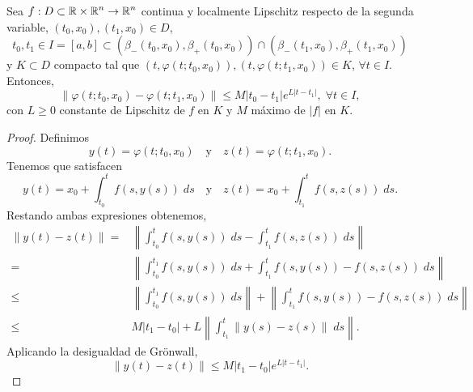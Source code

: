 \begin{prop}
Sea $\displaystyle f : D \subset \mathbb{R} \times \mathbb{R}^{n} \to \mathbb{R}^{n} $ continua y localmente Lipschitz respecto de la segunda variable, $\displaystyle \left(t_{0}, x_{0}\right), \left(t_{1}, x_{0}\right)\in D $, 
\[t_{0}, t_{1} \in I = \left[a,b\right] \subset \left(\beta_{-}\left(t_{0}, x_{0}\right), \beta_{+ }\left(t_{0}, x_{0}\right)\right) \cap \left(\beta_{- }\left(t_{1}, x_{0}\right), \beta_{+ }\left(t_{1},x_{0}\right)\right) \]
y $\displaystyle K \subset D $ compacto tal que $\displaystyle \left(t, \varphi\left(t; t_{0}, x_{0}\right)\right), \left(t, \varphi\left(t; t_{1}, x_{0}\right)\right)\in K $, $\displaystyle \forall t \in I $. Entonces,
\[\|\varphi\left(t; t_{0}, x_{0}\right)-\varphi\left(t; t_{1}, x_{0}\right)\| \leq M \left|t_{0}-t_{1}\right|e^{L \left|t-t_{1}\right|}, \; \forall t \in I ,\]
con $\displaystyle L \geq 0 $ constante de Lipschitz de $\displaystyle f $ en $\displaystyle K $ y $\displaystyle M $ máximo de $\displaystyle \left|f\right| $ en $\displaystyle K $.
\end{prop}
\begin{proof}
Definimos
\[y\left(t\right)=\varphi\left(t; t_{0}, x_{0}\right)\quad \text{y} \quad z\left(t\right)=\varphi\left(t; t_{1}, x_{0}\right) .\]
Tenemos que satisfacen 
\[ y\left(t\right)=x_{0} + \int^{t}_{t_{0}} f\left(s,y\left(s\right)\right) \; d s \quad \text{y} \quad z\left(t\right)=x_{0} +\int^{t}_{t_{1}} f\left(s, z\left(s\right)\right) \; d s .\]
Restando ambas expresiones obtenemos, 
\[
\begin{split}
	\left\|y\left(t\right)-z\left(t\right)\right\|= & \left\|\int^{t}_{t_{0}} f\left(s, y\left(s\right)\right) \; d s - \int^{t}_{t_{1}} f\left(s, z\left(s\right)\right) \; d s\right\| \\
	= & \left\|\int^{t_{1}}_{t_{0}} f\left(s, y\left(s\right)\right) \; d s + \int^{t}_{t_{1}} f\left(s, y\left(s\right)\right)-f\left(s,z\left(s\right)\right) \; d s\right\| \\
	\leq & \left\|\int^{t_{1}}_{t_{0}} f\left(s,y\left(s\right)\right) \; d s\right\| + \left\|\int^{t}_{t_{1}} f\left(s, y\left(s\right)\right)-f\left(s, z\left(s\right)\right) \; d s \right\| \\
	\leq & M \left|t_{1}-t_{0}\right| + L \left\|\int^{t}_{t_{1}} \|y\left(s\right)-z\left(s\right)\| \; d s\right\|.
\end{split}
\]
Aplicando la desigualdad de Grönwall, 
\[\|y\left(t\right)-z\left(t\right)\| \leq M \left|t_{1}-t_{0}\right|e^{L \left|t-t_{1}\right|} .\]
\end{proof}
